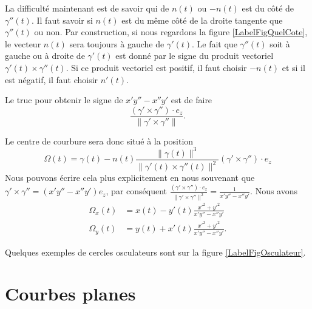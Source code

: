 La difficulté maintenant est de savoir qui de $n(t)$ ou $-n(t)$ est du côté de $\gamma''(t)$. Il faut savoir si $n(t)$ est du même côté de la droite tangente que $\gamma''(t)$ ou non. Par construction, si nous regardons la figure  \ref{LabelFigQuelCote}, le vecteur $n(t)$ sera toujours à gauche de $\gamma'(t)$. Le fait que $\gamma''(t)$ soit à gauche ou à droite de $\gamma'(t)$ est donné par le signe du produit vectoriel $\gamma'(t)\times \gamma''(t)$. Si ce produit vectoriel est positif, il faut choisir $-n(t)$ et si il est négatif, il faut choisir $n'(t)$.

Le truc pour obtenir le signe de $x'y''-x''y'$ est de faire
\begin{equation}
    \frac{ (\gamma'\times\gamma'')\cdot e_z}{\| \gamma'\times\gamma'' \|}.
\end{equation}

Le centre de courbure sera donc situé à la position
\begin{equation}
    \Omega(t)=\gamma(t)-n(t)\frac{ \| \gamma(t) \|^3 }{ \| \gamma'(t)\times\gamma''(t) \|^2 } (\gamma'\times\gamma'')\cdot e_z
\end{equation}
Nous pouvons écrire cela plus explicitement en nous souvenant que $\gamma'\times\gamma''=(x'y''-x''y')e_z$, par conséquent $\frac{ (\gamma'\times\gamma'')\cdot e_z}{\| \gamma'\times\gamma'' \|^2}=\frac{1}{ x'y''-x''y' }$. Nous avons
\begin{subequations}
    \begin{align}
        \Omega_x(t)&=x(t)-y'(t)\frac{ x'^2+y'^2 }{ x'y''-x''y' }\\
        \Omega_y(t)&=y(t)+x'(t)\frac{ x'^2+y'^2 }{ x'y''-x''y' }.
    \end{align}
\end{subequations}

Quelques exemples de cercles osculateurs sont sur la figure \ref{LabelFigOsculateur}.
\newcommand{\CaptionFigOsculateur}{Exemple de cercles osculateurs.}



\section{Courbes planes}

